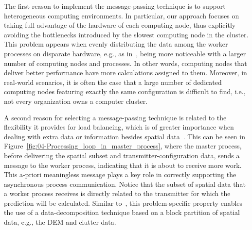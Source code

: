 The first reason to implement the message-passing technique is to
support heterogeneous computing environments. In particular, our approach
focuses on taking full advantage of the hardware of each computing
node, thus explicitly avoiding the bottlenecks introduced by the slowest
computing node in the cluster. This problem appears when evenly distributing
the data among the worker processes on disparate hardware, e.g., as
in~\cite{Akhter_Porting_GRASS_raster_module_to_distributed_computing:2007,Huang-Explorations_of_the_implementation_of_a_parallel_IDW_algorithm_in_a_Linux_cluster:2011},
being more noticeable with a larger number of computing nodes and
processes. In other words, computing nodes that deliver better performance
have more calculations assigned to them. Moreover, in real-world scenarios,
it is often the case that a large number of dedicated computing nodes
featuring exactly the same configuration is difficult to find, i.e.,
not every organization owns a computer cluster.

A second reason for selecting a message-passing technique is related
to the flexibility it provides for load balancing, which is of greater
importance when dealing with extra data or information besides spatial
data~\cite{Hawick_Distributed_frameworks_and_parallel_algorithms_for_processing_large_scala_geographic_data:2003}.
This can be seen in Figure~\ref{fig:04-Processing_loop_in_master_process},
where the master process, before delivering the spatial subset and
transmitter-configuration data, sends a message to the worker process,
indicating that it is about to receive more work. This a-priori meaningless
message plays a key role in correctly supporting the asynchronous
process communication. Notice that the subset of spatial data that
a worker process receives is directly related to the transmitter for
which the prediction will be calculated. Similar to~\cite{Tabik-High_performance_three_horizon_composition_algorithm_for_large_scale_terrains:2011,Tabik-Optimal_tilt_and_orientation_maps_a_multi_algorithm_approach_for_heterogeneous_multicore_GPU_systems:2013},
this problem-specific property enables the use of a data-decomposition
technique based on a block partition of spatial data, e.g., the DEM
and clutter data.

